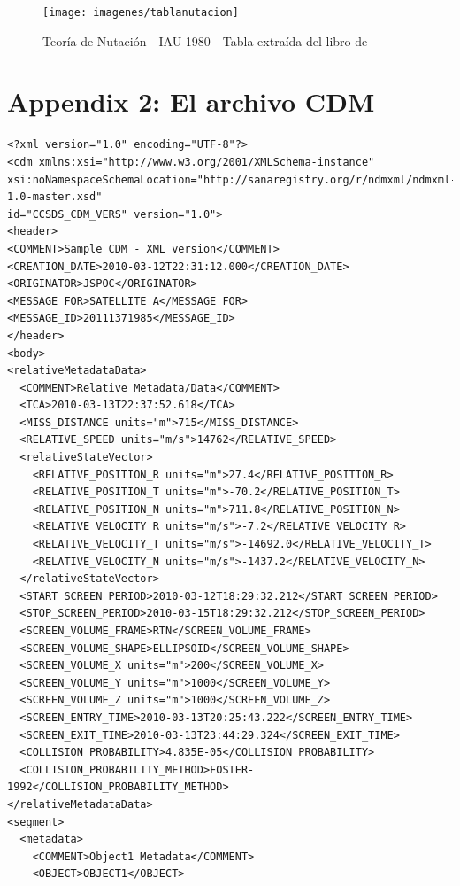 \begin{figure}[!h]
  \centering
  \texttt{[image: imagenes/tablanutacion]}
  \caption{Teor\'ia de Nutaci\'on - \ac{IAU} 1980 - Tabla extra\'ida del libro de \citep{montenbruck2012satellite}}
  \label{fig:tablaseidelman}
\end{figure}


\section{Appendix 2: El archivo CDM}
\label{App2}

\lstset{language=XML,basicstyle=\small}
\begin{lstlisting}
<?xml version="1.0" encoding="UTF-8"?>
<cdm xmlns:xsi="http://www.w3.org/2001/XMLSchema-instance"
xsi:noNamespaceSchemaLocation="http://sanaregistry.org/r/ndmxml/ndmxml-1.0-master.xsd"
id="CCSDS_CDM_VERS" version="1.0">
<header>
<COMMENT>Sample CDM - XML version</COMMENT>
<CREATION_DATE>2010-03-12T22:31:12.000</CREATION_DATE>
<ORIGINATOR>JSPOC</ORIGINATOR>
<MESSAGE_FOR>SATELLITE A</MESSAGE_FOR>
<MESSAGE_ID>20111371985</MESSAGE_ID>
</header>
<body>
<relativeMetadataData>
  <COMMENT>Relative Metadata/Data</COMMENT>
  <TCA>2010-03-13T22:37:52.618</TCA>
  <MISS_DISTANCE units="m">715</MISS_DISTANCE>
  <RELATIVE_SPEED units="m/s">14762</RELATIVE_SPEED>
  <relativeStateVector>
    <RELATIVE_POSITION_R units="m">27.4</RELATIVE_POSITION_R>
    <RELATIVE_POSITION_T units="m">-70.2</RELATIVE_POSITION_T>
    <RELATIVE_POSITION_N units="m">711.8</RELATIVE_POSITION_N>
    <RELATIVE_VELOCITY_R units="m/s">-7.2</RELATIVE_VELOCITY_R>
    <RELATIVE_VELOCITY_T units="m/s">-14692.0</RELATIVE_VELOCITY_T>
    <RELATIVE_VELOCITY_N units="m/s">-1437.2</RELATIVE_VELOCITY_N>
  </relativeStateVector>
  <START_SCREEN_PERIOD>2010-03-12T18:29:32.212</START_SCREEN_PERIOD>
  <STOP_SCREEN_PERIOD>2010-03-15T18:29:32.212</STOP_SCREEN_PERIOD>
  <SCREEN_VOLUME_FRAME>RTN</SCREEN_VOLUME_FRAME>
  <SCREEN_VOLUME_SHAPE>ELLIPSOID</SCREEN_VOLUME_SHAPE>
  <SCREEN_VOLUME_X units="m">200</SCREEN_VOLUME_X>
  <SCREEN_VOLUME_Y units="m">1000</SCREEN_VOLUME_Y>
  <SCREEN_VOLUME_Z units="m">1000</SCREEN_VOLUME_Z>
  <SCREEN_ENTRY_TIME>2010-03-13T20:25:43.222</SCREEN_ENTRY_TIME>
  <SCREEN_EXIT_TIME>2010-03-13T23:44:29.324</SCREEN_EXIT_TIME>
  <COLLISION_PROBABILITY>4.835E-05</COLLISION_PROBABILITY>
  <COLLISION_PROBABILITY_METHOD>FOSTER-1992</COLLISION_PROBABILITY_METHOD>
</relativeMetadataData>
<segment>
  <metadata>
    <COMMENT>Object1 Metadata</COMMENT>
    <OBJECT>OBJECT1</OBJECT>

\end{lstlisting}
